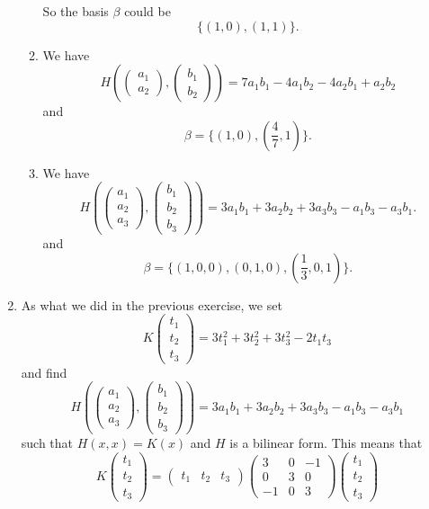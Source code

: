 \begin{enumerate}
\begin{enumerate}
So the basis $\beta $ could be 
\[\{(1,0),(1,1)\}.\]
\item We have 
\[H\left(\begin{pmatrix}a_1\\a_2\end{pmatrix},\begin{pmatrix}b_1\\b_2\end{pmatrix}\right)=7a_1b_1-4a_1b_2-4a_2b_1+a_2b_2\]
and 
\[\beta=\{(1,0),(\frac{4}{7},1)\}.\]
\item We have 
\[H\left(\begin{pmatrix}a_1\\a_2\\a_3\end{pmatrix},\begin{pmatrix}b_1\\b_2\\b_3\end{pmatrix}\right)=3a_1b_1+3a_2b_2+3a_3b_3-a_1b_3-a_3b_1.\]
and 
\[\beta=\{(1,0,0),(0,1,0),(\frac{1}{3},0,1)\}.\]
\end{enumerate}
\item As what we did in the previous exercise, we set 
\[K\begin{pmatrix}t_1\\t_2\\t_3\end{pmatrix}=3t_1^2+3t_2^2+3t_3^2-2t_1t_3\]
and find 
\[H\left(\begin{pmatrix}a_1\\a_2\\a_3\end{pmatrix},\begin{pmatrix}b_1\\b_2\\b_3\end{pmatrix}\right)=3a_1b_1+3a_2b_2+3a_3b_3-a_1b_3-a_3b_1\]
such that $H(x,x)=K(x)$ and $H$ is a bilinear form. This means that 
\[K\begin{pmatrix}t_1\\t_2\\t_3\end{pmatrix}=\begin{pmatrix}t_1&t_2&t_3\end{pmatrix}\begin{pmatrix}3&0&-1\\0&3&0\\-1&0&3\end{pmatrix}\begin{pmatrix}t_1\\t_2\\t_3\end{pmatrix}\]

\end{enumerate}
